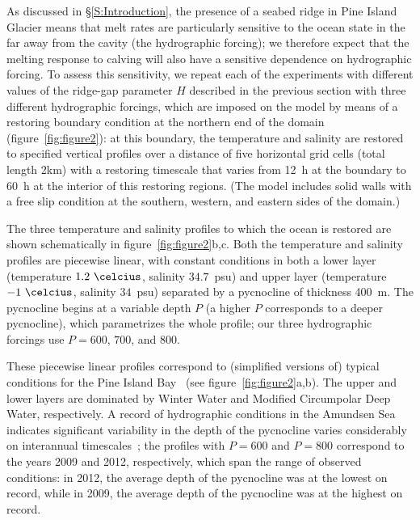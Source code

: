 \documentclass[draft]{agujournal2019}
\begin{document}
As discussed in \S\ref{S:Introduction}, the presence of a seabed ridge in Pine Island Glacier means that melt rates are particularly sensitive to the ocean state in the far away from the cavity (the hydrographic forcing); we therefore expect that the melting response to calving will also have a sensitive dependence on hydrographic forcing. To assess this sensitivity, we repeat each of the experiments with different values of the ridge-gap parameter $H$ described in the previous section with three different hydrographic forcings, which are imposed on the model by means of a restoring boundary condition at the northern end of the domain (figure~\ref{fig:figure2}): at this boundary, the temperature and salinity are restored to specified vertical profiles over a distance of five horizontal grid cells (total length 2km) with a restoring timescale that varies from 12~h at the boundary to 60~h at the interior of this restoring regions. (The model includes solid walls with a free slip condition at the southern, western, and eastern sides of the domain.)

The three temperature and salinity profiles to which the ocean is restored are shown schematically in figure~\ref{fig:figure2}b,c. Both the temperature and salinity profiles are piecewise linear, with constant conditions in both a lower layer (temperature $1.2~\si{\celcius}$, salinity $34.7$~psu) and upper layer (temperature $-1~\si{\celcius}$, salinity $34$~psu) separated by a pycnocline of thickness 400~m. The pycnocline begins at a variable depth $P$ (a higher $P$ corresponds to a deeper pycnocline), which parametrizes the whole profile; our three hydrographic forcings use $P = 600$, $700$, and $800$. 

These piecewise linear profiles correspond to (simplified versions of) typical conditions for the Pine Island Bay~\cite{Jacobs1996GRL, Dutrieux2014Science, Jenkins2018NatureGeo} (see figure~\ref{fig:figure2}a,b). The upper and lower layers are dominated by Winter Water and Modified Circumpolar Deep Water, respectively. A record of hydrographic conditions in the Amundsen Sea indicates significant variability in the depth of the pycnocline varies considerably on interannual timescales~\cite{Dutrieux2014Science}; the profiles with $P = 600$ and $P = 800$ correspond to the years 2009 and 2012, respectively, which span the range of observed conditions: in 2012, the average depth of the pycnocline was at the lowest on record, while in 2009, the average depth of the pycnocline was at the highest on record. 
\end{document}
